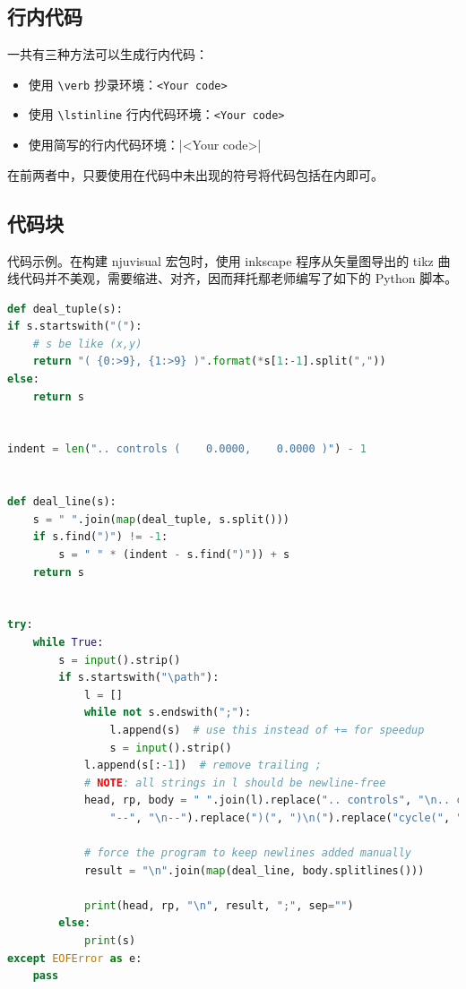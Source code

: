 \subsection{行内代码}

一共有三种方法可以生成行内代码：
\begin{itemize}
    \item 使用 \texttt{\textbackslash verb} 抄录环境：\verb!<Your code>!
    \item 使用 \texttt{\textbackslash lstinline} 行内代码环境：\lstinline[basicstyle=\tt]+<Your code>+
    \item 使用简写的行内代码环境：|<Your code>|
\end{itemize}
在前两者中，只要使用在代码中未出现的符号将代码包括在内即可。

\subsection{代码块}

代码示例。在构建 \textsf{njuvisual} 宏包时，使用 inkscape 程序从矢量图导出的 \textsf{tikz} 曲线代码并不美观，需要缩进、对齐，因而拜托鄢老师编写了如下的 Python 脚本。
\begin{lstlisting}[language=Python,morekeywords={startswith,endswith,split,strip,join,find,append,replace}]
def deal_tuple(s):
if s.startswith("("):
    # s be like (x,y)
    return "( {0:>9}, {1:>9} )".format(*s[1:-1].split(","))
else:
    return s


indent = len(".. controls (    0.0000,    0.0000 )") - 1


def deal_line(s):
    s = " ".join(map(deal_tuple, s.split()))
    if s.find(")") != -1:
        s = " " * (indent - s.find(")")) + s
    return s


try:
    while True:
        s = input().strip()
        if s.startswith("\path"):
            l = []
            while not s.endswith(";"):
                l.append(s)  # use this instead of += for speedup
                s = input().strip()
            l.append(s[:-1])  # remove trailing ;
            # NOTE: all strings in l should be newline-free
            head, rp, body = " ".join(l).replace(".. controls", "\n.. controls").replace(
                "--", "\n--").replace(")(", ")\n(").replace("cycle(", "cycle\n(").partition("]")

            # force the program to keep newlines added manually
            result = "\n".join(map(deal_line, body.splitlines()))

            print(head, rp, "\n", result, ";", sep="")
        else:
            print(s)
except EOFError as e:
    pass
\end{lstlisting}

